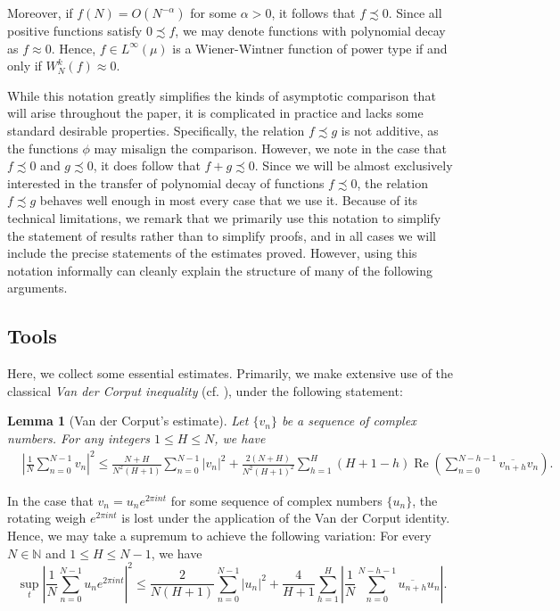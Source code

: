 \documentclass[11pt, oneside]{amsart}   	%
\newcommand{\1}{\mathbbm{1}}
\newcommand{\N}{\mathbb{N}}
\newcommand{\real}{\operatorname{Re}}
\newtheorem{lemma}[theorem]{Lemma}
\theoremstyle{definition}
\begin{document}
Moreover, if $f(N) = O(N^{-\alpha})$ for some $\alpha>0$, it follows that $f \precsim 0$. Since all positive functions satisfy $0 \precsim f$, we may denote functions with polynomial decay as $f \approx 0$. Hence, $f\in L^\infty (\mu)$ is a Wiener-Wintner function of power type if and only if $W_N^k (f) \approx 0$. 


While this notation greatly simplifies the kinds of asymptotic comparison that will arise throughout the paper, it is complicated in practice and lacks some standard desirable properties. Specifically, the relation $f \precsim g$ is not additive, as the functions $\phi$ may misalign the comparison. However, we note in the case that $f \precsim 0$ and $g \precsim 0$, it does follow that $f + g \precsim 0$. Since we will be almost exclusively interested in the transfer of polynomial decay of functions $f \precsim 0$, the relation $f \precsim g$ behaves well enough in most every case that we use it. Because of its technical limitations, we remark that we primarily use this notation to simplify the statement of results rather than to simplify proofs, and in all cases we will include the precise statements of the estimates proved. However, using this notation informally can cleanly explain the structure of many of the following arguments.

\subsection{Tools}\label{S:tools}
Here, we collect some essential estimates. Primarily, we make extensive use of the classical
\textit{Van der Corput inequality} (cf. \cite{KN74}), under the following statement:
		
		\begin{lemma}[Van der Corput's estimate]\label{vdc-lem}
			Let $\{v_n\}$ be a sequence of complex numbers. For any integers $1 \leq H \leq N$, we have
			\begin{align*}
				& \left| \frac{1}{N} \sum_{n=0}^{N-1} v_n \right|^2
				\leq \frac{N+H}{N^2(H+1)} \sum_{n=0}^{N-1} |v_n|^2 + \frac{2(N+H)}{N^2(H+1)^2} \sum_{h=1}^H(H+1-h) \real \left(\sum_{n=0}^{N-h-1} \overline{v_{n+h}} v_n \right).
			\end{align*}
		\end{lemma}
		
In the case that $v_n = u_ne^{2\pi int}$ for some sequence of complex numbers $\{u_n\}$, the rotating weigh $e^{2\pi i n t}$ is lost under the application of the Van der Corput identity. Hence, we may take a supremum to achieve the following variation: For every $N \in \N$ and $1 \leq H \leq N-1$, we have
		\begin{equation}\label{vdc-1}
			\sup_t \left| \frac{1}{N} \sum_{n=0}^{N-1} u_ne^{2\pi int} \right|^2
			\leq \frac{2}{N(H+1)} \sum_{n=0}^{N-1} |u_n|^2 + \frac{4}{H+1} \sum_{h=1}^H \left| \frac{1}{N}\sum_{n=0}^{N-h-1} \overline{u_{n+h}} u_n \right|.
		\end{equation}
\end{document}
